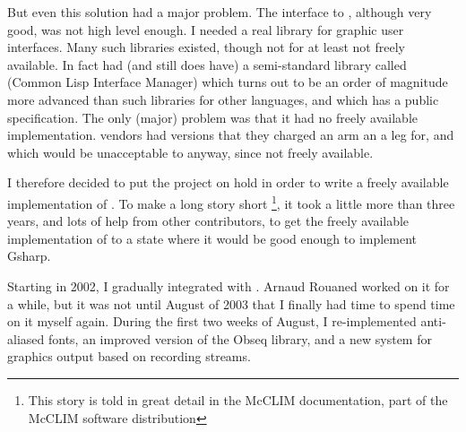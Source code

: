 But even this solution had a major problem.  The interface to {\xwin},
although very good, was not high level enough.  I needed a real
library for graphic user interfaces.  Many such libraries existed,
though not for {\commonlisp} at least not freely available.  In fact {\commonlisp} had
(and still does have) a semi-standard library called {\clim} (Common
Lisp Interface Manager) which turns out to be an order of magnitude
more advanced than such libraries for other languages, and which has a
public specification.  The only (major) problem was that it had no
freely available implementation.  {\commonlisp} vendors had versions that they
charged an arm an a leg for, and which would be unacceptable to {\gs}
anyway, since not freely available.  

I therefore decided to put the {\gs} project on hold in order to write
a freely available implementation of {\clim}.  To make a long story
short \footnote{This story is told in great detail in the McCLIM
  documentation, part of the McCLIM software distribution}, it took a
little more than three years, and lots of help from other
contributors, to get the freely available implementation of {\clim} to a
state where it would be good enough to implement Gsharp. 

Starting in 2002, I gradually integrated {\gs} with {\clim}.  Arnaud
Rouaned worked on it for a while, but it was not until August of 2003
that I finally had time to spend time on it myself again.  During the
first two weeks of August, I re-implemented anti-aliased fonts, an
improved version of the Obseq library, and a new system for graphics
output based on {\clim} recording streams. 
